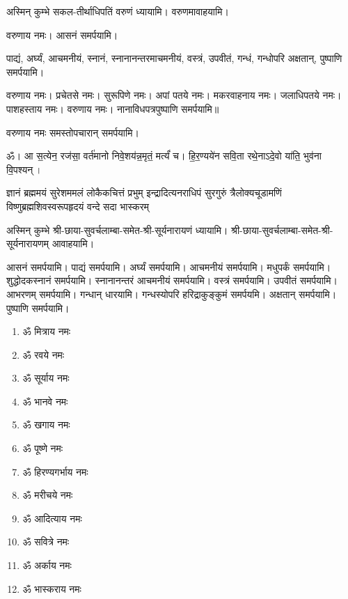 अस्मिन् कुम्भे सकल-तीर्थाधिपतिं वरुणं ध्यायामि। वरुणमावाहयामि।

वरुणाय नमः। आसनं समर्पयामि।

पाद्यं, अर्घ्यं, आचमनीयं, स्नानं, स्नानानन्तरमाचमनीयं, वस्त्रं, उपवीतं, गन्धं, गन्धोपरि अक्षतान्, पुष्पाणि समर्पयामि।

वरुणाय नमः। प्रचेतसे नमः। सुरूपिणे नमः। अपां पतये नमः। मकरवाहनाय नमः। जलाधिपतये नमः। पाशहस्ताय नमः। वरुणाय नमः। नानाविधपत्रपुष्पाणि समर्पयामि॥

वरुणाय नमः समस्तोपचारान् समर्पयामि।

ॐ। आ स॒त्येन॒ रज॑सा॒ वर्त॑मानो निवे॒शय॑न्न॒मृतं॒ मर्त्यं॑ च। हि॒र॒ण्यये॑न सवि॒ता रथे॒नाऽदे॒वो या॑ति॒ भुव॑ना वि॒पश्यन्। 

{ज्ञानं ब्रह्ममयं सुरेशममलं लोकैकचित्तं प्रभुम्}
{इन्द्रादित्यनराधिपं सुरगुरुं त्रैलोक्यचूडामणिं}
{विष्णुब्रह्मशिवस्वरूपहृदयं वन्दे सदा भास्करम्}

अस्मिन् कुम्भे श्री-छाया-सुवर्चलाम्बा-समेत-श्री-सूर्यनारायणं ध्यायामि। श्री-छाया-सुवर्चलाम्बा-समेत-श्री-सूर्यनारायणम् आवाहयामि।

आसनं समर्पयामि। पाद्यं समर्पयामि। अर्घ्यं समर्पयामि। आचमनीयं समर्पयामि। मधुपर्कं समर्पयामि। शुद्धोदकस्नानं समर्पयामि। स्नानानन्तरं आचमनीयं समर्पयामि। वस्त्रं समर्पयामि। उपवीतं समर्पयामि। आभरणम् समर्पयामि। गन्धान् धारयामि। गन्धस्योपरि हरिद्राकुङ्कुमं समर्पयमि। अक्षतान् समर्पयामि। पुष्पाणि समर्पयामि।


\begin{multicols}{2}
\begin{enumerate}
\item ॐ मित्राय नमः
\item ॐ रवये नमः
\item ॐ सूर्याय नमः
\item ॐ भानवे नमः
\item ॐ खगाय नमः
\item ॐ पूष्णे नमः
\item ॐ हिरण्यगर्भाय नमः
\item ॐ मरीचये नमः
\item ॐ आदित्याय नमः
\item ॐ सवित्रे नमः
\item ॐ अर्काय नमः
\item ॐ भास्कराय नमः

\end{enumerate}
\end{multicols}


